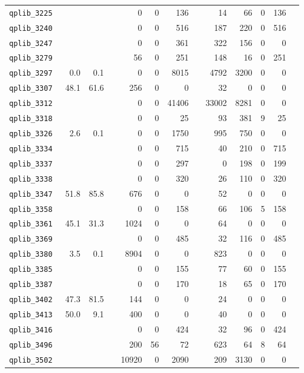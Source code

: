 {\begin{longtable}{lrrrrrrrrrrrr}
{\tt 	qplib\_3225	}	&		&		&	&	0	&	0	&	136	&	&	14	&	66	&	0	&	136	\\
{\tt 	qplib\_3240	}	&		&		&	&	0	&	0	&	516	&	&	187	&	220	&	0	&	516	\\
{\tt 	qplib\_3247	}	&		&		&	&	0	&	0	&	361	&	&	322	&	156	&	0	&	0	\\
{\tt 	qplib\_3279	}	&		&		&	&	56	&	0	&	251	&	&	148	&	16	&	0	&	251	\\
{\tt 	qplib\_3297	}	&	0.0	&	0.1	&	&	0	&	0	&	8015	&	&	4792	&	3200	&	0	&	0	\\
{\tt 	qplib\_3307	}	&	48.1	&	61.6	&	&	256	&	0	&	0	&	&	32	&	0	&	0	&	0	\\
{\tt 	qplib\_3312	}	&		&		&	&	0	&	0	&	41406	&	&	33002	&	8281	&	0	&	0	\\
{\tt 	qplib\_3318	}	&		&		&	&	0	&	0	&	25	&	&	93	&	381	&	9	&	25	\\
{\tt 	qplib\_3326	}	&	2.6	&	0.1	&	&	0	&	0	&	1750	&	&	995	&	750	&	0	&	0	\\
{\tt 	qplib\_3334	}	&		&		&	&	0	&	0	&	715	&	&	40	&	210	&	0	&	715	\\
{\tt 	qplib\_3337	}	&		&		&	&	0	&	0	&	297	&	&	0	&	198	&	0	&	199	\\
{\tt 	qplib\_3338	}	&		&		&	&	0	&	0	&	320	&	&	26	&	110	&	0	&	320	\\
{\tt 	qplib\_3347	}	&	51.8	&	85.8	&	&	676	&	0	&	0	&	&	52	&	0	&	0	&	0	\\
{\tt 	qplib\_3358	}	&		&		&	&	0	&	0	&	158	&	&	66	&	106	&	5	&	158	\\
{\tt 	qplib\_3361	}	&	45.1	&	31.3	&	&	1024	&	0	&	0	&	&	64	&	0	&	0	&	0	\\
{\tt 	qplib\_3369	}	&		&		&	&	0	&	0	&	485	&	&	32	&	116	&	0	&	485	\\
{\tt 	qplib\_3380	}	&	3.5	&	0.1	&	&	8904	&	0	&	0	&	&	823	&	0	&	0	&	0	\\
{\tt 	qplib\_3385	}	&		&		&	&	0	&	0	&	155	&	&	77	&	60	&	0	&	155	\\
{\tt 	qplib\_3387	}	&		&		&	&	0	&	0	&	170	&	&	18	&	65	&	0	&	170	\\
{\tt 	qplib\_3402	}	&	47.3	&	81.5	&	&	144	&	0	&	0	&	&	24	&	0	&	0	&	0	\\
{\tt 	qplib\_3413	}	&	50.0	&	9.1	&	&	400	&	0	&	0	&	&	40	&	0	&	0	&	0	\\
{\tt 	qplib\_3416	}	&		&		&	&	0	&	0	&	424	&	&	32	&	96	&	0	&	424	\\
{\tt 	qplib\_3496	}	&		&		&	&	200	&	56	&	72	&	&	623	&	64	&	8	&	64	\\
{\tt 	qplib\_3502	}	&		&		&	&	10920	&	0	&	2090	&	&	209	&	3130	&	0	&	0	\\

\end{longtable}}
